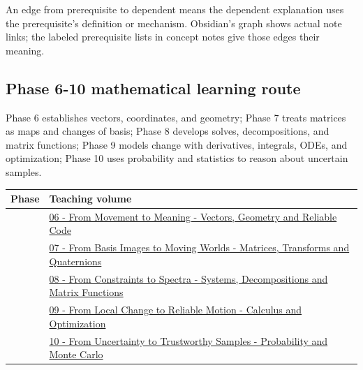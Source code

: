 An edge from prerequisite to dependent means the dependent explanation uses the prerequisite's definition or mechanism. Obsidian's graph shows actual note links; the labeled prerequisite lists in concept notes give those edges their meaning.

\subsection{Phase 6-10 mathematical learning route}\label{phase-6-10-mathematical-learning-route}

Phase 6 establishes vectors, coordinates, and geometry; Phase 7 treats matrices as maps and changes of basis; Phase 8 develops solves, decompositions, and matrix functions; Phase 9 models change with derivatives, integrals, ODEs, and optimization; Phase 10 uses probability and statistics to reason about uncertain samples.

{\def\LTcaptype{none} %
\begin{longtable}[]{@{}
  >{\raggedright\arraybackslash}p{}
  >{\raggedright\arraybackslash}p{}@{}}
\toprule\noalign{}
\begin{minipage}[b]{\linewidth}\raggedright
Phase
\end{minipage} & \begin{minipage}[b]{\linewidth}\raggedright
Teaching volume
\end{minipage} \\
\midrule\noalign{}
\endhead
\bottomrule\noalign{}
\endlastfoot
6 & \href{Continuous\%20Notes/Computing\%20Foundations\%20-\%20From\%20Bits\%20to\%20C++\%20and\%20Systems\%20APIs\#The\%20panel\%20gives\%20us\%20a\%20reason\%20to\%20learn/}{06 - From Movement to Meaning - Vectors, Geometry and Reliable Code} \\
7 & \href{Continuous\%20Notes/Computing\%20Foundations\%20-\%20From\%20Bits\%20to\%20C++\%20and\%20Systems\%20APIs\#Keep\%20the\%20promises\%20visible\%20while\%20moving\%20between\%20representations/}{07 - From Basis Images to Moving Worlds - Matrices, Transforms and Quaternions} \\
8 & \href{Continuous\%20Notes/Computing\%20Foundations\%20-\%20From\%20Bits\%20to\%20C++\%20and\%20Systems\%20APIs\#The\%20graphics\%20problem\%20hiding\%20inside\%20a\%20matrix\%20equation/}{08 - From Constraints to Spectra - Systems, Decompositions and Matrix Functions} \\
9 & \href{Continuous\%20Notes/Computing\%20Foundations\%20-\%20From\%20Bits\%20to\%20C++\%20and\%20Systems\%20APIs\#Functions,\%20limits,\%20continuity,\%20and\%20scalar\%20change/}{09 - From Local Change to Reliable Motion - Calculus and Optimization} \\
10 & \href{Continuous\%20Notes/Computing\%20Foundations\%20-\%20From\%20Bits\%20to\%20C++\%20and\%20Systems\%20APIs\#Learning\%20route/}{10 - From Uncertainty to Trustworthy Samples - Probability and Monte Carlo} \\
\end{longtable}
}


